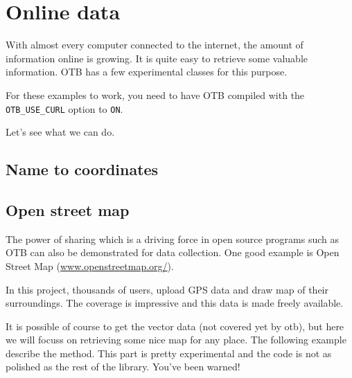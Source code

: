 \chapter{Online data}\label{sec:Online}

With almost every computer connected to the internet, the amount
of information online is growing. It is quite easy to retrieve some
valuable information. OTB has a few experimental classes for this purpose.

For these examples to work, you need to have OTB compiled with the
\texttt{OTB\_USE\_CURL} option to \texttt{ON}.

Let's see what we can do.

\section{Name to coordinates}
\label{sec:NamesToCoordinates}



\section{Open street map}
\label{sec:OpenStreetMap}

The power of sharing which is a driving force in open source programs such
as OTB can also be demonstrated for data collection. One good example is
Open Street Map (\url{www.openstreetmap.org/}).

In this project, thousands of users, upload GPS data and draw map of their
surroundings. The coverage is impressive and this data is made freely available.

It is possible of course to get the vector data (not covered yet by otb), but
here we will focuss on retrieving some nice map for any place. The following
example describe the method. This part is pretty experimental and the code is
not as polished as the rest of the library. You've been warned!



